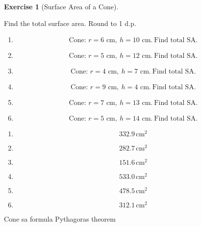 \documentclass[
  letterpaper,
  DIV=11,
  numbers=noendperiod]{scrreprt}
\theoremstyle{definition}
\newtheorem{exercise}{Exercise}[chapter]
\theoremstyle{remark}
\begin{document}
\begin{exercise}[Surface Area of a
Cone]\protect\hypertarget{exr-cur-14}{}\label{exr-cur-14}

Find the total surface area. Round to 1 d.p.

\begin{enumerate}
\def\labelenumi{\alph{enumi})}
\item
  \[\text{Cone: }r=6\text{ cm},\ h=10\text{ cm.}\ \text{Find total SA.}\]
\item
  \[\text{Cone: }r=5\text{ cm},\ h=12\text{ cm.}\ \text{Find total SA.}\]
\item
  \[\text{Cone: }r=4\text{ cm},\ h=7\text{ cm.}\ \text{Find total SA.}\]
\item
  \[\text{Cone: }r=9\text{ cm},\ h=4\text{ cm.}\ \text{Find total SA.}\]
\item
  \[\text{Cone: }r=7\text{ cm},\ h=13\text{ cm.}\ \text{Find total SA.}\]
\item
  \[\text{Cone: }r=5\text{ cm},\ h=14\text{ cm.}\ \text{Find total SA.}\]
\end{enumerate}

\begin{tcolorbox}[enhanced jigsaw, opacitybacktitle=0.6, coltitle=black, arc=.35mm, colframe=quarto-callout-tip-color-frame, colback=white, bottomrule=.15mm, left=2mm, colbacktitle=quarto-callout-tip-color!10!white, titlerule=0mm, opacityback=0, title=\textcolor{quarto-callout-tip-color}{\faLightbulb}\hspace{0.5em}{🔍 View Solution}, leftrule=.75mm, breakable, rightrule=.15mm, bottomtitle=1mm, toptitle=1mm, toprule=.15mm]

\begin{enumerate}
\def\labelenumi{\alph{enumi})}
\item
  \[332.9\,\text{cm}^{2}\]
\item
  \[282.7\,\text{cm}^{2}\]
\item
  \[151.6\,\text{cm}^{2}\]
\item
  \[533.0\,\text{cm}^{2}\]
\item
  \[478.5\,\text{cm}^{2}\]
\item
  \[312.1\,\text{cm}^{2}\]
\end{enumerate}

\end{tcolorbox}

{Cone sa formula} {Pythagoras theorem}

\end{exercise}
\end{document}
